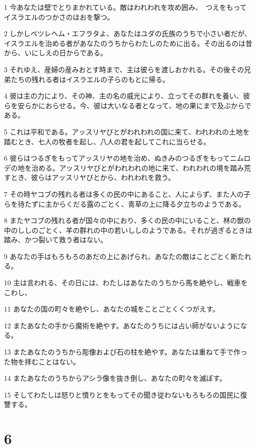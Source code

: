 \par 1 今あなたは壁でとりまかれている。敵はわれわれを攻め囲み、　つえをもってイスラエルのつかさのほおを撃つ。
\par 2 しかしベツレヘム・エフラタよ、あなたはユダの氏族のうちで小さい者だが、イスラエルを治める者があなたのうちからわたしのために出る。その出るのは昔から、いにしえの日からである。
\par 3 それゆえ、産婦の産みおとす時まで、主は彼らを渡しおかれる。その後その兄弟たちの残れる者はイスラエルの子らのもとに帰る。
\par 4 彼は主の力により、その神、主の名の威光により、立ってその群れを養い、彼らを安らかにおらせる。今、彼は大いなる者となって、地の果にまで及ぶからである。
\par 5 これは平和である。アッスリヤびとがわれわれの国に来て、われわれの土地を踏むとき、七人の牧者を起し、八人の君を起してこれに当らせる。
\par 6 彼らはつるぎをもってアッスリヤの地を治め、ぬきみのつるぎをもってニムロデの地を治める。アッスリヤびとがわれわれの地に来て、われわれの境を踏み荒すとき、彼らはアッスリヤびとから、われわれを救う。
\par 7 その時ヤコブの残れる者は多くの民の中にあること、人によらず、また人の子らを待たずに主からくだる露のごとく、青草の上に降る夕立ちのようである。
\par 8 またヤコブの残れる者が国々の中におり、多くの民の中にいること、林の獣の中のししのごとく、羊の群れの中の若いししのようである。それが過ぎるときは踏み、かつ裂いて救う者はない。
\par 9 あなたの手はもろもろのあだの上にあげられ、あなたの敵はことごとく断たれる。
\par 10 主は言われる、その日には、わたしはあなたのうちから馬を絶やし、戦車をこわし、
\par 11 あなたの国の町々を絶やし、あなたの城をことごとくくつがえす。
\par 12 またあなたの手から魔術を絶やす。あなたのうちには占い師がないようになる。
\par 13 またあなたのうちから彫像および石の柱を絶やす。あなたは重ねて手で作った物を拝むことはない。
\par 14 またあなたのうちからアシラ像を抜き倒し、あなたの町々を滅ぼす。
\par 15 そしてわたしは怒りと憤りとをもってその聞き従わないもろもろの国民に復讐する。

\chapter{6}

